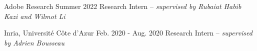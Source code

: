 

\begin{cventries}


  \cventry
    {Adobe Research} %
    {Summer 2022} %
    {
      Research Intern -- \textit{supervised by Rubaiat Habib Kazi and Wilmot Li}
    }

  \cventry
    {Inria, Université Côte d'Azur} %
    {Feb. 2020 - Aug. 2020} %
    {Research Intern -- \textit{supervised by Adrien Bousseau}} %



\end{cventries}
